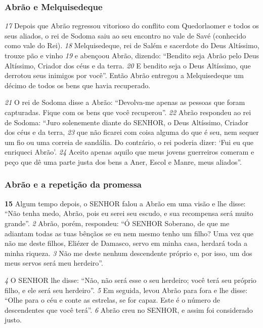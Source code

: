 \bigskip
\subsubsection*{Abrão e Melquisedeque}
\textit{\tiny 17}
Depois que Abrão regressou vitorioso do conflito com Quedorlaomer e todos os
seus aliados, o rei de Sodoma saiu ao seu encontro no vale de Savé (conhecido
como vale do Rei).
\textit{\tiny 18}
Melquisedeque, rei de Salém e sacerdote do Deus Altíssimo, trouxe pão e
vinho 
\textit{\tiny 19}
e abençoou Abrão, dizendo:
  “Bendito seja Abrão pelo Deus Altíssimo,
    Criador dos céus e da terra.
\textit{\tiny 20}
E bendito seja o Deus Altíssimo, que derrotou seus inimigos por você”.
Então Abrão entregou a Melquisedeque um décimo de todos os bens que havia
recuperado.

\bigskip
\textit{\tiny 21}
O rei de Sodoma disse a Abrão: “Devolva-me apenas as pessoas que foram
capturadas. Fique com os bens que você recuperou”.
\textit{\tiny 22}
Abrão respondeu ao rei de Sodoma: “Juro solenemente diante do SENHOR, o
Deus Altíssimo, Criador dos céus e da terra, 
\textit{\tiny 23}
que não ficarei com coisa alguma
do que é seu, nem sequer um fio ou uma correia de sandália. Do contrário, o rei
poderia dizer: ‘Fui eu que enriqueci Abrão’. 
\textit{\tiny 24}
Aceito apenas aquilo que meus
jovens guerreiros comeram e peço que dê uma parte justa dos bens a Aner, Escol e
Manre, meus aliados”.

\bigskip
\subsubsection*{Abrão e a repetição da promessa}
\textbf{\large 15}
 Algum tempo depois, o SENHOR falou a Abrão em uma visão e lhe disse:
“Não tenha medo, Abrão, pois eu serei seu escudo, e sua recompensa será muito
grande”.
\textit{\tiny 2}
Abrão, porém, respondeu: “Ó SENHOR Soberano, de que me adiantam todas as
tuas bênçãos se eu nem mesmo tenho um filho? Uma vez que não me deste filhos,
Eliézer de Damasco, servo em minha casa, herdará toda a minha riqueza. 
\textit{\tiny 3}
Não me
deste nenhum descendente próprio e, por isso, um dos meus servos será meu
herdeiro”.

\bigskip
\textit{\tiny 4}
O SENHOR lhe disse: “Não, não será esse o seu herdeiro; você terá seu próprio
filho, e ele será seu herdeiro”. 
\textit{\tiny 5}
Em seguida, levou Abrão para fora e lhe disse:
“Olhe para o céu e conte as estrelas, se for capaz. Este é o número de
descendentes que você terá”.
\textit{\tiny 6}
Abrão creu no SENHOR, e assim foi considerado justo.

